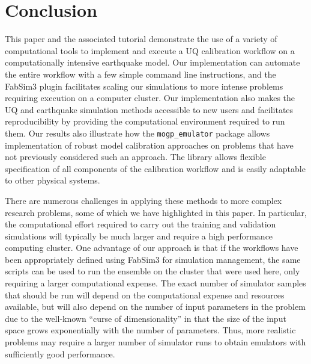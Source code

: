 \documentclass[openacc]{rstransa}%
\begin{document}
\section{Conclusion}

This paper and the associated tutorial demonstrate the use of a variety of computational tools
to implement and execute a UQ calibration workflow on a computationally intensive earthquake
model. Our implementation can automate the entire workflow with a few simple command line
instructions, and the FabSim3 plugin facilitates scaling our simulations to more intense
problems requiring execution on a computer cluster. Our implementation also makes the UQ
and earthquake simulation methods accessible to new users and facilitates reproducibility
by providing the computational environment required to run them.
Our results also illustrate how the \texttt{mogp\_emulator} package allows implementation of
robust model calibration approaches on problems that have not previously considered such
an approach. The library allows flexible specification of all components of the calibration
workflow and is easily adaptable to other physical systems.

There are numerous challenges in applying these methods to more complex
research problems, some of which we have highlighted in this paper. In
particular, the computational effort required to carry out the training
and validation simulations will typically be much larger and require a high
performance computing cluster. One advantage of our approach is that if
the workflows have been appropriately defined using FabSim3 for simulation
management, the same scripts can be used to run the ensemble on the
cluster that were used here, only requiring a larger computational
expense. The exact number of simulator samples that should be run will
depend on the computational expense and resources available, but will
also depend on the number of input parameters in the problem due to the
well-known ``curse of dimensionality'' in that the size of the input
space grows exponentially with the number of parameters. Thus, more
realistic problems may require a larger number of simulator runs to
obtain emulators with sufficiently good performance.
\end{document}
